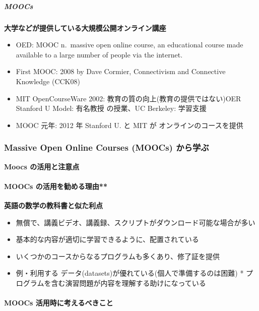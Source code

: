 \documentclass[
]{bxjsbook}
\providecommand{\tightlist}{%
  \setlength{\itemsep}{0pt}\setlength{\parskip}{0pt}}
\theoremstyle{definition}
\theoremstyle{definition}
\theoremstyle{definition}
\theoremstyle{definition}
\theoremstyle{remark}
\begin{document}
\hypertarget{moocs}{%
\subparagraph{MOOCs}\label{moocs}}

\textbf{大学などが提供している大規模公開オンライン講座}

\begin{itemize}
\tightlist
\item
  OED: MOOC n.~massive open online course, an educational course made available to a large number of people via the internet.
\item
  First MOOC: 2008 by Dave Cormier, Connectivism and Connective Knowledge (CCK08)
\item
  MIT OpenCourseWare 2002: 教育の質の向上(教育の提供ではない)OER Stanford U Model: 有名教授
  の授業、UC Berkeley: 学習支援
\item
  MOOC 元年: 2012 年 Stanford U. と MIT が オンラインのコースを提供
\end{itemize}

\hypertarget{massive-open-online-courses-moocs-ux304bux3089ux5b66ux3076}{%
\subsubsection{Massive Open Online Courses (MOOCs) から学ぶ}\label{massive-open-online-courses-moocs-ux304bux3089ux5b66ux3076}}

\textbf{Moocs の活用と注意点}

\hypertarget{moocs-ux306eux6d3bux7528ux3092ux52e7ux3081ux308bux7406ux7531}{%
\paragraph{MOOCs の活用を勧める理由**}\label{moocs-ux306eux6d3bux7528ux3092ux52e7ux3081ux308bux7406ux7531}}

\textbf{英語の数学の教科書と似た利点}

\begin{itemize}
\tightlist
\item
  無償で、講義ビデオ、講義録、スクリプトがダウンロード可能な場合が多い
\item
  基本的な内容が適切に学習できるように、配置されている
\item
  いくつかのコースからなるプログラムも多くあり、修了証を提供
\item
  例・利用する データ(datasets)が優れている(個人で準備するのは困難) * プログラムを含む演習問題が内容を理解する助けになっている
\end{itemize}

\hypertarget{moocs-ux6d3bux7528ux6642ux306bux8003ux3048ux308bux3079ux304dux3053ux3068}{%
\paragraph{MOOCs 活用時に考えるべきこと}\label{moocs-ux6d3bux7528ux6642ux306bux8003ux3048ux308bux3079ux304dux3053ux3068}}
\end{document}
